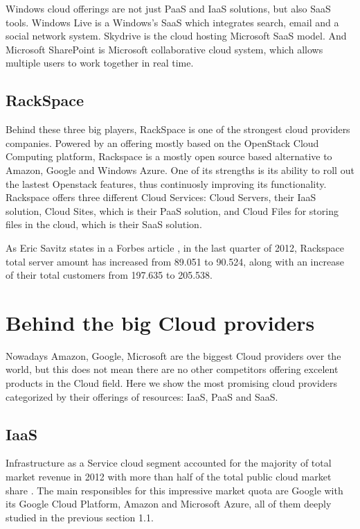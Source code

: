 Windows cloud offerings are not just PaaS and IaaS solutions, but also SaaS tools. Windows Live is a Windows's SaaS which integrates search, email and a social network system. Skydrive is the cloud hosting Microsoft SaaS model. And Microsoft SharePoint is Microsoft collaborative cloud system, which allows multiple users to work together in real time.


\subsection{RackSpace}

Behind these three big players, RackSpace \cite{RackSpace} is one of the strongest cloud providers companies. Powered by an offering mostly based on the OpenStack Cloud Computing platform, Rackspace is a mostly open source based alternative to Amazon, Google and Windows Azure. One of its strengths is its ability to roll out the lastest Openstack features, thus continuosly improving its functionality. Rackspace offers three different Cloud Services: Cloud Servers, their IaaS solution, Cloud Sites, which is their PaaS solution, and Cloud Files for storing files in the cloud, which is their SaaS solution. 
\par
As Eric Savitz states in a Forbes article \cite{Rackspace:forbes}, in the last quarter of 2012, Rackspace total server amount has increased from 89.051 to 90.524, along with an increase of their total customers from 197.635 to 205.538.

\section{Behind the big Cloud providers}

Nowadays Amazon, Google, Microsoft are the biggest Cloud providers over the world, but this does not mean there are no other competitors offering excelent products in the Cloud field. Here we show the most promising cloud providers categorized by their offerings of resources: IaaS, PaaS and SaaS.

\subsection{IaaS}

Infrastructure as a Service cloud segment accounted for the majority of total market revenue in 2012 with more than half of the total public cloud market share \cite{aslett2013451}. The main responsibles for this impressive market quota are Google with its Google Cloud Platform, Amazon and Microsoft Azure, all of them deeply studied in the previous section 1.1. 


